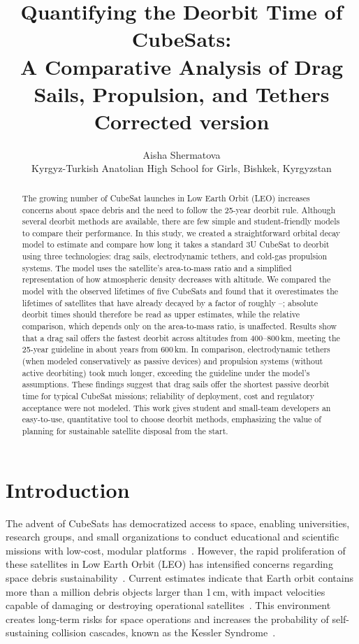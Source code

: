 \documentclass[11pt,a4paper]{article}
\title{\bfseries Quantifying the Deorbit Time of CubeSats:\\ A Comparative Analysis of Drag Sails, Propulsion, and Tethers\\[4pt]\large Corrected version}
\author{Aisha Shermatova\\{\small Kyrgyz-Turkish Anatolian High School for Girls, Bishkek, Kyrgyzstan}}
\date{}
\begin{document}
\maketitle

\begin{abstract}
The growing number of CubeSat launches in Low Earth Orbit (LEO) increases concerns about space debris and the need to follow the 25-year deorbit rule. Although several deorbit methods are available, there are few simple and student-friendly models to compare their performance. In this study, we created a straightforward orbital decay model to estimate and compare how long it takes a standard 3U CubeSat to deorbit using three technologies: drag sails, electrodynamic tethers, and cold-gas propulsion systems. The model uses the satellite's area-to-mass ratio and a simplified representation of how atmospheric density decreases with altitude.
We compared the model with the observed lifetimes of five CubeSats and found that it overestimates the lifetimes of satellites that have already decayed by a factor of roughly \ValLo--\ValHi; absolute deorbit times should therefore be read as upper estimates, while the relative comparison, which depends only on the area-to-mass ratio, is unaffected. Results show that a drag sail offers the fastest deorbit across altitudes from 400--800\,km, meeting the 25-year guideline in about \SailSix{} years from 600\,km. In comparison, electrodynamic tethers (when modeled conservatively as passive devices) and propulsion systems (without active deorbiting) took much longer, exceeding the guideline under the model's assumptions. These findings suggest that drag sails offer the shortest passive deorbit time for typical CubeSat missions; reliability of deployment, cost and regulatory acceptance were not modeled. This work gives student and small-team developers an easy-to-use, quantitative tool to choose deorbit methods, emphasizing the value of planning for sustainable satellite disposal from the start.
\end{abstract}

\section{Introduction}
The advent of CubeSats has democratized access to space, enabling universities, research groups, and small organizations to conduct educational and scientific missions with low-cost, modular platforms~\cite{villela}. However, the rapid proliferation of these satellites in Low Earth Orbit (LEO) has intensified concerns regarding space debris sustainability~\cite{esa2025}. Current estimates indicate that Earth orbit contains more than a million debris objects larger than 1\,cm, with impact velocities capable of damaging or destroying operational satellites~\cite{esa2025}. This environment creates long-term risks for space operations and increases the probability of self-sustaining collision cascades, known as the Kessler Syndrome~\cite{kessler}.
\end{document}
